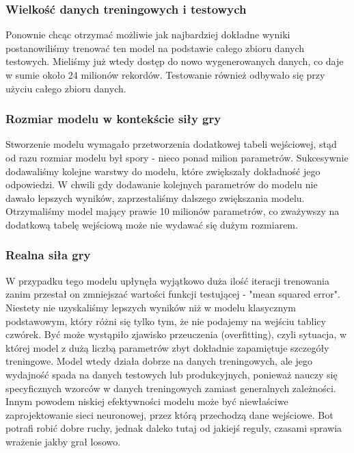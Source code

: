 \documentclass[12pt]{article}
\begin{document}
\subsubsection{Wielkość danych treningowych i testowych}

Ponownie chcąc otrzymać możliwie jak najbardziej dokładne wyniki postanowiliśmy trenować ten model na podstawie całego zbioru danych testowych. Mieliśmy już wtedy dostęp do nowo wygenerowanych danych, co daje w sumie około 24 milionów rekordów. Testowanie również odbywało się przy użyciu całego zbioru danych.

\subsubsection{Rozmiar modelu w kontekście siły gry}

Stworzenie modelu wymagało przetworzenia dodatkowej tabeli wejściowej, stąd od razu rozmiar modelu był spory - nieco ponad milion parametrów. Sukcesywnie dodawaliśmy kolejne warstwy do modelu, które zwiększały dokładność jego odpowiedzi. W chwili gdy dodawanie kolejnych parametrów do modelu nie dawało lepszych wyników, zaprzestaliśmy dalszego zwiększania modelu. Otrzymaliśmy model mający prawie 10 milionów parametrów, co zważywszy na dodatkową tabelę wejściową może nie wydawać się dużym rozmiarem.

\subsubsection{Realna siła gry}

W przypadku tego modelu upłynęła wyjątkowo duża ilość iteracji trenowania zanim przestał on zmniejszać wartości funkcji testującej - "mean squared error". Niestety nie uzyskaliśmy lepszych wyników niż w modelu klasycznym podstawowym, który różni się tylko tym, że nie podajemy na wejściu tablicy czwórek. Być może wystąpiło zjawisko przeuczenia (overfitting), czyli sytuacja, w której model z dużą liczbą parametrów zbyt dokładnie zapamiętuje szczegóły treningowe. Model wtedy działa dobrze na danych treningowych, ale jego wydajność spada na danych testowych lub produkcyjnych, ponieważ nauczy się specyficznych wzorców w danych treningowych zamiast generalnych zależności. Innym powodem niskiej efektywności modelu może być niewłaściwe zaprojektowanie sieci neuronowej, przez którą przechodzą dane wejściowe. Bot potrafi robić dobre ruchy, jednak daleko tutaj od jakiejś reguły, czasami sprawia wrażenie jakby grał losowo.
\end{document}
